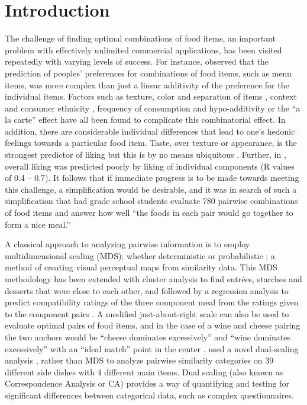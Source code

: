 \section{Introduction}
The challenge of finding optimal combinations of food items, an important problem with effectively unlimited commercial applications, has been visited repeatedly with varying levels of success.  For instance, \citet{Eindhoven1959} observed that the prediction of peoples’ preferences for combinations of food items, such as menu items, was more complex than just a linear additivity of the preference for the individual items.  Factors such as texture, color and separation of items \citep{Eindhoven1959,Pilgrim1961}, context and consumer ethnicity \citep{Marshall2003,Niewind1986}, frequency of consumption \citep{Marshall2003} and hypo-additivity or the “a la carte” effect \citep{Lawless1994} have all been found to complicate this combinatorial effect.  In addition, there are considerable individual differences that lead to one’s hedonic feelings towards a particular food item.  Taste, over texture or appearance, is the strongest predictor of liking but this is by no means ubiquitous \citep{Moskowitz1995}.   Further, in \citet{Moskowitz1995}, overall liking was predicted poorly by liking of individual components (R values of 0.4 – 0.7).  It follows that if immediate progress is to be made towards meeting this challenge, a simplification would be desirable, and it was in search of such a simplification that \citet{Worsley1984} had grade school students evaluate 780 pairwise combinations of food items and answer how well “the foods in each pair would go together to form a nice meal.”  

A classical approach to analyzing pairwise information is to employ multidimensional scaling (MDS); whether deterministic \citep{Schiffman1981} or probabilistic \citep{Ennis1988}; a method of creating visual perceptual maps from similarity data.  This MDS methodology has been extended with cluster analysis to find entrées, starches and desserts that were close to each other, and followed by a regression analysis to predict compatibility ratings of the three component meal from the ratings given to the component pairs \citep{Klarman1977}.  A modified just-about-right scale \citep{Johnson1987} can also be used to evaluate optimal pairs of food items, and in the case of a wine and cheese pairing the two anchors would be “cheese dominates excessively” and “wine dominates excessively” with an “ideal match” point in the center \citep{King2005}.  \citet{Niewind1986} used a novel dual-scaling analysis \citep{Nishisato1984}, rather than MDS to analyze pairwise similarity categories on 39 different side dishes with 4 different main items.  Dual scaling (also known as Correspondence Analysis or CA) provides a way of quantifying and testing for significant differences between categorical data, such as complex questionnaires.

